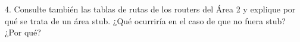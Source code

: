\begin{ejer}
4. Consulte también las tablas de rutas de los routers del Área 2 y explique por qué se trata de un área stub. ¿Qué ocurriría en el caso de que no fuera stub? ¿Por qué?
\end{ejer}